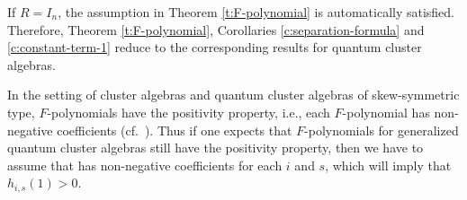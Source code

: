\documentclass[10pt,a4paper]{amsart}
\numberwithin{equation}{section}
\begin{document}
\begin{Remark}
 If $R=I_n$, the assumption in Theorem \ref{t:F-polynomial} is automatically satisfied. Therefore, Theorem \ref{t:F-polynomial}, Corollaries \ref{c:separation-formula} and \ref{c:constant-term-1} reduce to the corresponding results for quantum cluster algebras.
\end{Remark}
\begin{Remark}
 In the setting of cluster algebras and quantum cluster algebras of skew-symmet\-ric type, $F$-polynomials have the positivity property, i.e., each $F$-polynomial has non-negative coefficients (cf.\ \cite{Davison18,GHKK2018}). Thus if one expects that $F$-polynomials for generalized quantum cluster algebras still have the positivity property, then we have to assume that  has non-negative coefficients for each $i$ and $s$, which will imply that $h_{i,s}(1)>0$.
\end{Remark}
\end{document}
